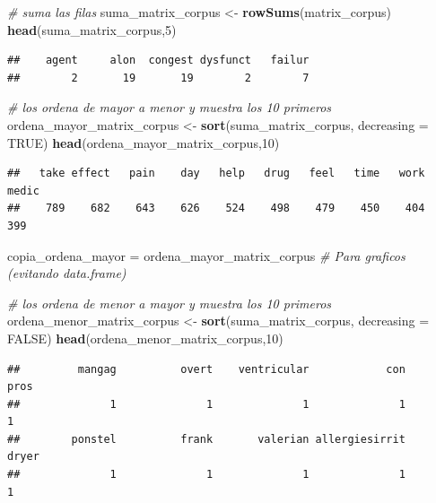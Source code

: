 \documentclass[spanish,]{article}
\newenvironment{Shaded}{\begin{snugshade}}{\end{snugshade}}
\newcommand{\KeywordTok}[1]{\textcolor[rgb]{0.13,0.29,0.53}{\textbf{#1}}}
\newcommand{\DataTypeTok}[1]{\textcolor[rgb]{0.13,0.29,0.53}{#1}}
\newcommand{\DecValTok}[1]{\textcolor[rgb]{0.00,0.00,0.81}{#1}}
\newcommand{\StringTok}[1]{\textcolor[rgb]{0.31,0.60,0.02}{#1}}
\newcommand{\CommentTok}[1]{\textcolor[rgb]{0.56,0.35,0.01}{\textit{#1}}}
\newcommand{\OtherTok}[1]{\textcolor[rgb]{0.56,0.35,0.01}{#1}}
\newcommand{\NormalTok}[1]{#1}
\begin{document}
\begin{Shaded}
\begin{Highlighting}[]
\CommentTok{# suma las filas}
\NormalTok{suma_matrix_corpus <-}\StringTok{ }\KeywordTok{rowSums}\NormalTok{(matrix_corpus)}
\KeywordTok{head}\NormalTok{(suma_matrix_corpus,}\DecValTok{5}\NormalTok{)}
\end{Highlighting}
\end{Shaded}

\begin{verbatim}
##    agent     alon  congest dysfunct   failur 
##        2       19       19        2        7
\end{verbatim}

\begin{Shaded}
\begin{Highlighting}[]
\CommentTok{# los ordena de mayor a menor y muestra los 10 primeros}
\NormalTok{ordena_mayor_matrix_corpus <-}\StringTok{ }\KeywordTok{sort}\NormalTok{(suma_matrix_corpus, }\DataTypeTok{decreasing =} \OtherTok{TRUE}\NormalTok{)}
\KeywordTok{head}\NormalTok{(ordena_mayor_matrix_corpus,}\DecValTok{10}\NormalTok{)}
\end{Highlighting}
\end{Shaded}

\begin{verbatim}
##   take effect   pain    day   help   drug   feel   time   work  medic 
##    789    682    643    626    524    498    479    450    404    399
\end{verbatim}

\begin{Shaded}
\begin{Highlighting}[]
\NormalTok{copia_ordena_mayor =}\StringTok{ }\NormalTok{ordena_mayor_matrix_corpus }\CommentTok{# Para graficos (evitando data.frame)}

\CommentTok{# los ordena de menor a mayor y muestra los 10 primeros}
\NormalTok{ordena_menor_matrix_corpus <-}\StringTok{ }\KeywordTok{sort}\NormalTok{(suma_matrix_corpus, }\DataTypeTok{decreasing =} \OtherTok{FALSE}\NormalTok{)}
\KeywordTok{head}\NormalTok{(ordena_menor_matrix_corpus,}\DecValTok{10}\NormalTok{)}
\end{Highlighting}
\end{Shaded}

\begin{verbatim}
##         mangag          overt    ventricular            con           pros 
##              1              1              1              1              1 
##        ponstel          frank       valerian allergiesirrit          dryer 
##              1              1              1              1              1
\end{verbatim}
\end{document}
